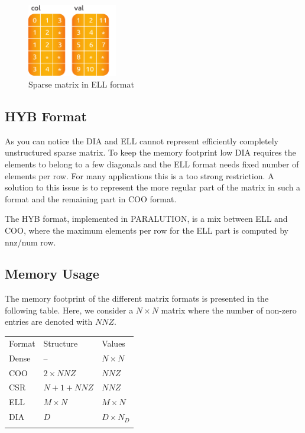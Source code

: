 \begin{figure}[!ht]
\centering
\includegraphics[width=0.35\textwidth]{./fig/mat/ell.pdf}
\caption{Sparse matrix in ELL format}
\end{figure}

\subsection{HYB Format}

As you can notice the DIA and ELL cannot represent efficiently completely unstructured sparse matrix. To keep the memory footprint low DIA requires the elements to belong to a few diagonals and the ELL format needs fixed number of elements per row. For many applications this is a too strong restriction. A solution to this issue is to represent the more regular part of the matrix in such a format and the remaining part in COO format.

The HYB format, implemented in PARALUTION, is a mix between ELL and COO, where the maximum elements per row for the ELL part is computed by nnz/num row. 

\subsection{Memory Usage}

The memory footprint of the different matrix formats is presented in the following table. Here, we consider a $N \times N$ matrix where the number of non-zero entries are denoted with $NNZ$.

\begin{table}[ht]
\centering
\begin{tabular}{l l l}
\hline\noalign{\smallskip}
Format & Structure & Values \\
\noalign{\smallskip}\hline\noalign{\smallskip}
Dense & --  & $N \times N$ \\
COO & $2 \times NNZ$  & $NNZ$ \\
CSR & $N+1 + NNZ$     & $NNZ$ \\
ELL & $M \times N$    & $M \times N$ \\
DIA & $D$             & $D \times N_{D}$ \\
\noalign{\smallskip}\hline\noalign{\smallskip}
\end{tabular}
\end{table}

